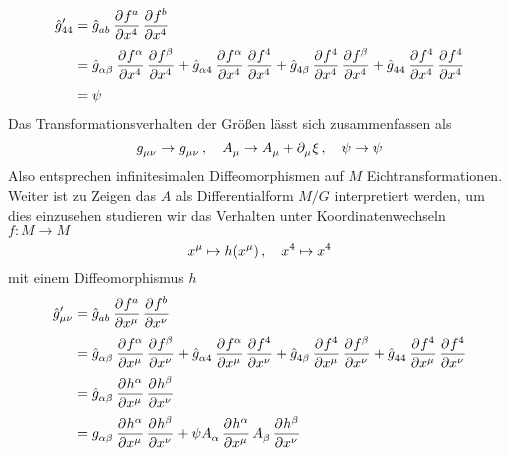 \begin{equation}
\begin{split}
\tensor*{\fived{g}}{*^\prime_4_4}&=\tensor{\fived{g}}{_a_b}\dpd{f^a}{\tensor{x}{^4}}\dpd{f^b}{\tensor{x}{^4}}\\
&=\tensor{\fived{g}}{_\alpha_\beta}\dpd{f^\alpha}{\tensor{x}{^4}}\dpd{f^\beta}{\tensor{x}{^4}}
+\tensor{\fived{g}}{_\alpha_4}\dpd{f^\alpha}{\tensor{x}{^4}}\dpd{f^4}{\tensor{x}{^4}}
+\tensor{\fived{g}}{_4_\beta}\dpd{f^4}{\tensor{x}{^4}}\dpd{f^\beta}{\tensor{x}{^4}}
+\tensor{\fived{g}}{_4_4}\dpd{f^4}{\tensor{x}{^4}}\dpd{f^4}{\tensor{x}{^4}}\\
&=\psi
\end{split}
\end{equation}
Das Transformationsverhalten der Größen lässt sich zusammenfassen als 
\begin{equation}
\tensor{g}{_\mu_\nu}\to\tensor{g}{_\mu_\nu}\,,\quad
\tensor{A}{_\mu}\to\tensor{A}{_\mu}+\pdif{_\mu}\xi\,,\quad
\psi\to\psi
\end{equation}
Also entsprechen infinitesimalen Diffeomorphismen auf $M$ Eichtransformationen.
Weiter ist zu Zeigen das $A$ als Differentialform $M/G$ interpretiert werden,
um dies einzusehen studieren wir das Verhalten unter Koordinatenwechseln $f:M\to
M$
\begin{equation}
\tensor{x}{^\mu}\mapsto
h(\tensor{x}{^\mu})\,,\quad\tensor{x}{^4}\mapsto\tensor{x}{^4}
\end{equation}
mit einem Diffeomorphismus $h$
\begin{equation}
\begin{split}
\tensor*{\fived{g}}{*^\prime_\mu_\nu}&=\tensor{\fived{g}}{_a_b}\dpd{f^a}{\tensor{x}{^\mu}}\dpd{f^b}{\tensor{x}{^\nu}}\\
&=\tensor{\fived{g}}{_\alpha_\beta}\dpd{f^\alpha}{\tensor{x}{^\mu}}\dpd{f^\beta}{\tensor{x}{^\nu}}
+\tensor{\fived{g}}{_\alpha_4}\dpd{f^\alpha}{\tensor{x}{^\mu}}\dpd{f^4}{\tensor{x}{^\nu}}
+\tensor{\fived{g}}{_4_\beta}\dpd{f^4}{\tensor{x}{^\mu}}\dpd{f^\beta}{\tensor{x}{^\nu}}
+\tensor{\fived{g}}{_4_4}\dpd{f^4}{\tensor{x}{^\mu}}\dpd{f^4}{\tensor{x}{^\nu}}\\
&=\tensor{\fived{g}}{_\alpha_\beta}\dpd{h^\alpha}{\tensor{x}{^\mu}}\dpd{h^\beta}{\tensor{x}{^\nu}}\\
&=\tensor{g}{_\alpha_\beta}\dpd{h^\alpha}{\tensor{x}{^\mu}}\dpd{h^\beta}{\tensor{x}{^\nu}}
+\psi\tensor{A}{_\alpha}\dpd{h^\alpha}{\tensor{x}{^\mu}}
\tensor{A}{_\beta}\dpd{h^\beta}{\tensor{x}{^\nu}}
\end{split}
\end{equation}
